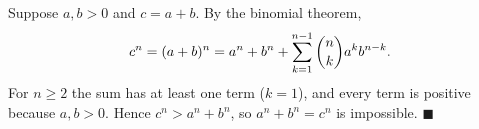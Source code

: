 Suppose $a,b>0$ and $c=a+b$. By the binomial theorem,
\[c^n=(a+b)^n=a^n+b^n+\sum_{k=1}^{n-1}\dbinom nk a^k b^{n-k}.\]
For $n\ge2$ the sum has at least one term ($k=1$), and every term is positive because $a,b>0$. Hence $c^n>a^n+b^n$, so $a^n+b^n=c^n$ is impossible. $\blacksquare$
